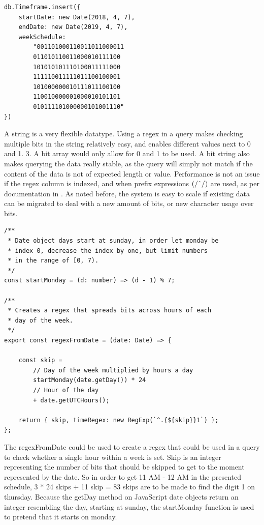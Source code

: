 \begin{center}
\noindent\begin{minipage}{.85\textwidth}
\begin{lstlisting}[caption={Improved timeframe.}, label={lst:new-timeframe}]
db.Timeframe.insert({
	startDate: new Date(2018, 4, 7),
	endDate: new Date(2019, 4, 7),
	weekSchedule:
		"001101000110011011000011
		011010110011000010111100
		101010101110100011111000
		111110011111011100100001
		101000000010111011100100
		110010000001000010101101
		010111101000000101001110"
})
\end{lstlisting}
\end{minipage}
\end{center}

A string is a very flexible datatype. Using a regex in a query makes checking multiple bits in the string relatively easy, and enables different values next to 0 and 1. 3. A bit array would only allow for 0 and 1 to be used. A bit string also makes querying the data really stable, as the query will simply not match if the content of the data is not of expected length or value. Performance is not an issue if the regex column is indexed, and when prefix expressions $(/\string^/)$ are used, as per documentation in \cite{MongoDB-Regex}. As noted before, the system is easy to scale if existing data can be migrated to deal with a new amount of bits, or new character usage over bits.

\begin{center}
\noindent\begin{minipage}{.85\textwidth}
\begin{lstlisting}[caption={Opening timeframe.}, label={lst:open-timeframe}]
/**
 * Date object days start at sunday, in order let monday be
 * index 0, decrease the index by one, but limit numbers
 * in the range of [0, 7).
 */
const startMonday = (d: number) => (d - 1) % 7;

/**
 * Creates a regex that spreads bits across hours of each
 * day of the week.
 */
export const regexFromDate = (date: Date) => {

	const skip =
		// Day of the week multiplied by hours a day
		startMonday(date.getDay()) * 24
		// Hour of the day
		+ date.getUTCHours();

	return { skip, timeRegex: new RegExp(`^.{${skip}}1`) };
};
\end{lstlisting}
\end{minipage}
\end{center}

The regexFromDate could be used to create a regex that could be used in a query to check whether a single hour within a week is set. Skip is an integer representing the number of bits that should be skipped to get to the moment represented by the date. So in order to get 11 AM - 12 AM in the presented schedule, 3 * 24 skips + 11 skip = 83 skips are to be made to find the digit 1 on thursday. Because the getDay method on JavaScript date objects return an integer resembling the day, starting at sunday, the startMonday function is used to pretend that it starts on monday.

